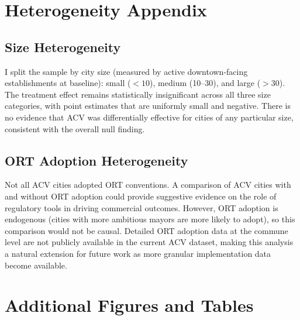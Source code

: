 \documentclass[12pt]{article}
\begin{document}
\section{Heterogeneity Appendix}
\label{app:heterogeneity}

\subsection{Size Heterogeneity}

I split the sample by city size (measured by active downtown-facing establishments at baseline): small ($<10$), medium (10--30), and large ($>30$). The treatment effect remains statistically insignificant across all three size categories, with point estimates that are uniformly small and negative. There is no evidence that ACV was differentially effective for cities of any particular size, consistent with the overall null finding.

\subsection{ORT Adoption Heterogeneity}

Not all ACV cities adopted ORT conventions. A comparison of ACV cities with and without ORT adoption could provide suggestive evidence on the role of regulatory tools in driving commercial outcomes. However, ORT adoption is endogenous (cities with more ambitious mayors are more likely to adopt), so this comparison would not be causal. Detailed ORT adoption data at the commune level are not publicly available in the current ACV dataset, making this analysis a natural extension for future work as more granular implementation data become available.

\section{Additional Figures and Tables}
\label{app:exhibits}


\end{document}
